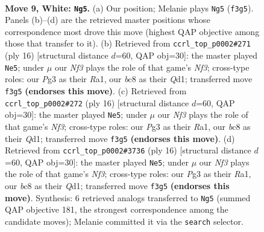\documentclass[11pt]{article}
\begin{document}
\clearpage

\begin{figure}[p]\centering
\begin{subfigure}{0.46\textwidth}\centering
\resizebox{\linewidth}{!}{%
\newchessgame
\chessboard[
  setfen={rnbq1rk1/p3bpp1/4pn2/1ppp3p/7P/3P1NPB/PPPNPP2/R1BQ1RK1 w - - 0 9},
  showmover=false,
  pgfstyle=straightmove, color=movearrow, markmove={f3-g5}
]}
\caption{}
\end{subfigure}\hfill
\begin{subfigure}{0.46\textwidth}\centering
\resizebox{\linewidth}{!}{%
\newchessgame
\chessboard[
  setfen={rnbq1rk1/pp2bppp/2p1pn2/8/2pP1B2/5NP1/PP2PPBP/RN1Q1RK1 w - - 0 9},
  showmover=false,
  pgfstyle=straightmove, color=movearrow, markmove={f3-e5}
]}
\caption{}
\end{subfigure}
\\[4pt]
\begin{subfigure}{0.46\textwidth}\centering
\resizebox{\linewidth}{!}{%
\newchessgame
\chessboard[
  setfen={rnbq1rk1/pp2bppp/2p1pn2/8/2pP1B2/5NP1/PP2PPBP/RN1Q1RK1 w - - 0 9},
  showmover=false,
  pgfstyle=straightmove, color=movearrow, markmove={f3-e5}
]}
\caption{}
\end{subfigure}\hfill
\begin{subfigure}{0.46\textwidth}\centering
\resizebox{\linewidth}{!}{%
\newchessgame
\chessboard[
  setfen={rnbq1rk1/pp2bppp/2p1pn2/8/2pP1B2/5NP1/PP2PPBP/RN1Q1RK1 w - - 0 9},
  showmover=false,
  pgfstyle=straightmove, color=movearrow, markmove={f3-e5}
]}
\caption{}
\end{subfigure}
\caption{\textbf{Move 9, White: \texttt{Ng5}.} (a) Our position; Melanie plays \texttt{Ng5} (\texttt{f3g5}). Panels (b)--(d) are the retrieved master positions whose correspondence most drove this move (highest QAP objective among those that transfer to it). (b) Retrieved from \texttt{ccrl\_top\_p0002\#271} (ply 16) [structural distance $d$=60, QAP obj=30]: the master played \texttt{Ne5}; under $\mu$ our \emph{Nf3} plays the role of that game's \emph{Nf3}; cross-type roles: our \emph{P}g3 as their \emph{R}a1, our \emph{b}c8 as their \emph{Q}d1; transferred move \texttt{f3g5} \textbf{(endorses this move)}. (c) Retrieved from \texttt{ccrl\_top\_p0002\#272} (ply 16) [structural distance $d$=60, QAP obj=30]: the master played \texttt{Ne5}; under $\mu$ our \emph{Nf3} plays the role of that game's \emph{Nf3}; cross-type roles: our \emph{P}g3 as their \emph{R}a1, our \emph{b}c8 as their \emph{Q}d1; transferred move \texttt{f3g5} \textbf{(endorses this move)}. (d) Retrieved from \texttt{ccrl\_top\_p0002\#3736} (ply 16) [structural distance $d$=60, QAP obj=30]: the master played \texttt{Ne5}; under $\mu$ our \emph{Nf3} plays the role of that game's \emph{Nf3}; cross-type roles: our \emph{P}g3 as their \emph{R}a1, our \emph{b}c8 as their \emph{Q}d1; transferred move \texttt{f3g5} \textbf{(endorses this move)}. Synthesis: 6 retrieved analogs transferred to \texttt{Ng5} (summed QAP objective 181, the strongest correspondence among the candidate moves); Melanie committed it via the \texttt{search} selector.}
\label{fig:thought-m16}
\end{figure}
\end{document}
